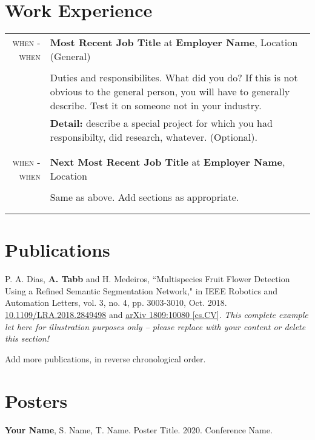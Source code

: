 \documentclass[a4paper,11pt]{article}
\newcommand{\job}[2]{\large\sffamily \textbf{#1} at \textbf{#2}}
\newcommand{\sep}{\multicolumn{2}{c}{}\\}
\begin{document}
\section{Work Experience}
\begin{longtable}{r|p{}}
  \textsc{when - when} & \job{Most Recent Job Title}{Employer Name}, Location (General) \\
    &\\
    &Duties and responsibilites.  What did you do?  If this is not obvious to the general person, you will have to generally describe. Test it on someone not in your industry.  \\
    &{\bf Detail:} describe a special project for which you had responsibilty, did research, whatever. (Optional).\\\sep
  
  \hline
  \sep
  
  \textsc{when - when} & \job{Next Most Recent Job Title}{Employer Name}, Location \\
    &\\
    &Same as above.  Add sections as appropriate.\\\sep
   \hline
  \sep
\end{longtable}

\section{Publications}
\begin{enumerate}[noitemsep, leftmargin=*,label={[\arabic*]}]
\item{P. A. Dias, \textbf{A. Tabb} and H. Medeiros, ``Multispecies Fruit Flower Detection Using a Refined Semantic Segmentation Network," in IEEE Robotics and Automation Letters, vol. 3, no. 4, pp. 3003-3010, Oct. 2018.\\ \href{https://doi.org/10.1109/LRA.2018.2849498}{10.1109/LRA.2018.2849498} and \href{https://arxiv.org/abs/1809.10080}{arXiv 1809:10080 [cs.CV]}. {\it This complete example let here for illustration purposes only -- please replace with your content or delete this section!}}
\item{Add more publications, in reverse chronological order.}
\end{enumerate}


\section{Posters}
\begin{enumerate}[noitemsep, leftmargin=*,label={[P\arabic*]}]
\item{\textbf{Your Name}, S. Name, T. Name. Poster Title. 2020. Conference Name.}
\end{enumerate}
\end{document}
